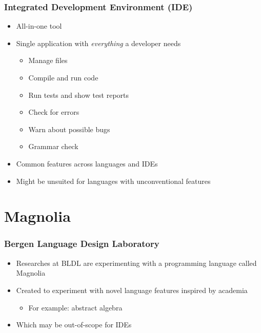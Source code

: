 \begin{frame}
  \frametitle{Integrated Development Environment (IDE)}
  \begin{itemize}
      \pause
    \item All-in-one tool
      \pause
    \item Single application with \textit{everything} a developer needs
      \pause
      \begin{itemize}
        \item Manage files
        \pause
        \item Compile and run code
        \pause
        \item Run tests and show test reports
        \pause
        \item Check for errors
        \pause
        \item Warn about possible bugs
        \pause
        \item Grammar check
      \end{itemize}
    \pause
    \item Common features across languages and IDEs
    \pause
    \item Might be unsuited for languages with unconventional features
  \end{itemize}
\end{frame}

\section{Magnolia}
\SectionPage

\begin{frame}
  \frametitle{Bergen Language Design Laboratory}
  \begin{itemize}
    \item Researches at BLDL are experimenting with a programming language
    called Magnolia
      \pause
    \item Created to experiment with novel language features inspired by
    academia
      \pause
      \begin{itemize}
        \item For example: abstract algebra
      \end{itemize}
      \pause
    \item Which may be out-of-scope for IDEs
  \end{itemize}
\end{frame}


